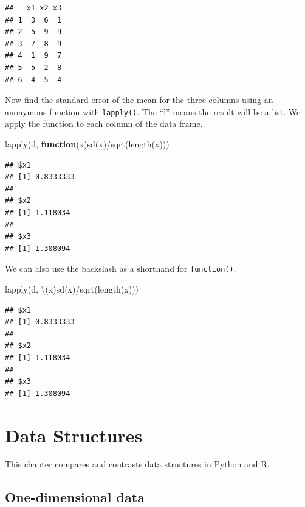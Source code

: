 \documentclass[
]{book}
\newenvironment{Shaded}{\begin{snugshade}}{\end{snugshade}}
\newcommand{\ControlFlowTok}[1]{\textcolor[rgb]{0.13,0.29,0.53}{\textbf{#1}}}
\newcommand{\FunctionTok}[1]{\textcolor[rgb]{0.00,0.00,0.00}{#1}}
\newcommand{\NormalTok}[1]{#1}
\newcommand{\SpecialCharTok}[1]{\textcolor[rgb]{0.00,0.00,0.00}{#1}}
\begin{document}
\begin{verbatim}
##   x1 x2 x3
## 1  3  6  1
## 2  5  9  9
## 3  7  8  9
## 4  1  9  7
## 5  5  2  8
## 6  4  5  4
\end{verbatim}

Now find the standard error of the mean for the three columns using an anonymous function with \texttt{lapply()}. The ``l'' means the result will be a list. We apply the function to each column of the data frame.

\begin{Shaded}
\begin{Highlighting}[]
\FunctionTok{lapply}\NormalTok{(d, }\ControlFlowTok{function}\NormalTok{(x)}\FunctionTok{sd}\NormalTok{(x)}\SpecialCharTok{/}\FunctionTok{sqrt}\NormalTok{(}\FunctionTok{length}\NormalTok{(x)))}
\end{Highlighting}
\end{Shaded}

\begin{verbatim}
## $x1
## [1] 0.8333333
## 
## $x2
## [1] 1.118034
## 
## $x3
## [1] 1.308094
\end{verbatim}

We can also use the backslash as a shorthand for \texttt{function()}.

\begin{Shaded}
\begin{Highlighting}[]
\FunctionTok{lapply}\NormalTok{(d, \textbackslash{}(x)}\FunctionTok{sd}\NormalTok{(x)}\SpecialCharTok{/}\FunctionTok{sqrt}\NormalTok{(}\FunctionTok{length}\NormalTok{(x)))}
\end{Highlighting}
\end{Shaded}

\begin{verbatim}
## $x1
## [1] 0.8333333
## 
## $x2
## [1] 1.118034
## 
## $x3
## [1] 1.308094
\end{verbatim}

\hypertarget{data-structures}{%
\chapter{Data Structures}\label{data-structures}}

This chapter compares and contrasts data structures in Python and R.

\hypertarget{one-dimensional-data}{%
\section{One-dimensional data}\label{one-dimensional-data}}
\end{document}
